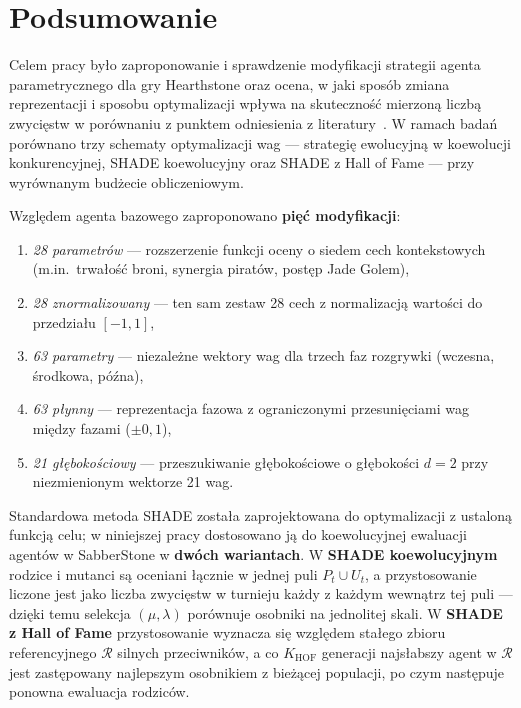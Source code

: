 \section{Podsumowanie}

Celem pracy było zaproponowanie i sprawdzenie modyfikacji strategii agenta parametrycznego dla gry Hearthstone oraz ocena, w jaki sposób zmiana reprezentacji i sposobu optymalizacji wpływa na skuteczność mierzoną liczbą zwycięstw w porównaniu z punktem odniesienia z literatury~\cite{sanchez2020}. W ramach badań porównano trzy schematy optymalizacji wag --- strategię ewolucyjną w koewolucji konkurencyjnej, SHADE koewolucyjny oraz SHADE z Hall of Fame --- przy wyrównanym budżecie obliczeniowym.

Względem agenta bazowego zaproponowano \textbf{pięć modyfikacji}:
\begin{enumerate}
    \item \textit{28 parametrów} --- rozszerzenie funkcji oceny o siedem cech kontekstowych (m.in.\ trwałość broni, synergia piratów, postęp Jade Golem),
    \item \textit{28 znormalizowany} --- ten sam zestaw 28 cech z normalizacją wartości do przedziału $[-1, 1]$,
    \item \textit{63 parametry} --- niezależne wektory wag dla trzech faz rozgrywki (wczesna, środkowa, późna),
    \item \textit{63 płynny} --- reprezentacja fazowa z ograniczonymi przesunięciami wag między fazami ($\pm 0{,}1$),
    \item \textit{21 głębokościowy} --- przeszukiwanie głębokościowe o głębokości $d = 2$ przy niezmienionym wektorze 21 wag.
\end{enumerate}

Standardowa metoda SHADE została zaprojektowana do optymalizacji z ustaloną funkcją celu; w niniejszej pracy dostosowano ją do koewolucyjnej ewaluacji agentów w SabberStone w \textbf{dwóch wariantach}. W \textbf{SHADE koewolucyjnym} rodzice i mutanci są oceniani łącznie w jednej puli $P_t \cup U_t$, a przystosowanie liczone jest jako liczba zwycięstw w turnieju każdy z każdym wewnątrz tej puli --- dzięki temu selekcja $(\mu,\lambda)$ porównuje osobniki na jednolitej skali. W \textbf{SHADE z Hall of Fame} przystosowanie wyznacza się względem stałego zbioru referencyjnego $\mathcal{R}$ silnych przeciwników, a co $K_{\text{HOF}}$ generacji najsłabszy agent w $\mathcal{R}$ jest zastępowany najlepszym osobnikiem z bieżącej populacji, po czym następuje ponowna ewaluacja rodziców.

